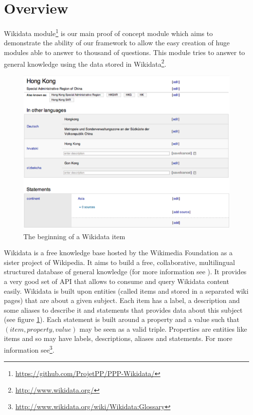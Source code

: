 \section{Overview}
Wikidata module\footnote{\url{https://github.com/ProjetPP/PPP-Wikidata/}} is our main proof of concept module which aims to demonstrate the ability of our framework to allow the easy creation of huge modules able to answer to thousand of questions. This module tries to answer to general knowledge using the data stored in Wikidata\footnote{\url{http://www.wikidata.org/}}.

\begin{figure}[!h]
  \centering
    \label{wikidata:item-screenshot}
    \caption{The beginning of a Wikidata item}
    \includegraphics[width=\textwidth]{./wikidata-item-screenshot.png}
\end{figure}

Wikidata is a free knowledge base hosted by the Wikimedia Foundation as a sister project of Wikipedia. It aims to build a free, collaborative, multilingual structured database of general knowledge (for more information see \cite{42240}). It provides a very good set of API that allows to consume and query Wikidata content easily. Wikidata is built upon entities (called items and stored in a separated wiki pages) that are about a given subject. Each item has a label, a description and some aliases to describe it and statements that provides data about this subject (see figure \ref{wikidata:item-screenshot}). Each statement is built around a property and a value such that $(item, property, value)$ may be seen as a valid triple. Properties are entities like items and so may have labels, descriptions, aliases and statements. For more information see\footnote{\url{http://www.wikidata.org/wiki/Wikidata:Glossary}}.

